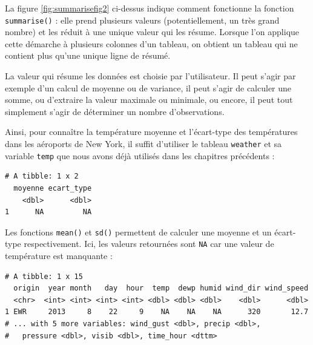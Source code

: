 \documentclass[
  a4paper,
]{article}
\newenvironment{Shaded}{\begin{snugshade}}{\end{snugshade}}
\newcommand{\DataTypeTok}[1]{\textcolor[rgb]{0.00,0.34,0.68}{#1}}
\newcommand{\KeywordTok}[1]{\textcolor[rgb]{0.12,0.11,0.11}{\textbf{#1}}}
\newcommand{\NormalTok}[1]{\textcolor[rgb]{0.12,0.11,0.11}{#1}}
\newcommand{\OperatorTok}[1]{\textcolor[rgb]{0.12,0.11,0.11}{#1}}
\newcommand{\StringTok}[1]{\textcolor[rgb]{0.75,0.01,0.01}{#1}}
\begin{document}
La figure \ref{fig:summarisefig2} ci-dessus indique comment fonctionne la fonction \texttt{summarise()} : elle prend plusieurs valeurs (potentiellement, un très grand nombre) et les réduit à une unique valeur qui les résume. Lorsque l'on applique cette démarche à plusieurs colonnes d'un tableau, on obtient un tableau qui ne contient plus qu'une unique ligne de résumé.

La valeur qui résume les données est choisie par l'utilisateur. Il peut s'agir par exemple d'un calcul de moyenne ou de variance, il peut s'agir de calculer une somme, ou d'extraire la valeur maximale ou minimale, ou encore, il peut tout simplement s'agir de déterminer un nombre d'observations.

Ainsi, pour connaître la température moyenne et l'écart-type des températures dans les aéroports de New York, il suffit d'utiliser le tableau \texttt{weather} et sa variable \texttt{temp} que nous avons déjà utilisés dans les chapitres précédents :

\begin{Shaded}
\end{Shaded}

\begin{verbatim}
# A tibble: 1 x 2
  moyenne ecart_type
    <dbl>      <dbl>
1      NA         NA
\end{verbatim}

Les fonctions \texttt{mean()} et \texttt{sd()} permettent de calculer une moyenne et un écart-type respectivement. Ici, les valeurs retournées sont \texttt{NA} car une valeur de température est manquante :

\begin{Shaded}
\end{Shaded}

\begin{verbatim}
# A tibble: 1 x 15
  origin  year month   day  hour  temp  dewp humid wind_dir wind_speed
  <chr>  <int> <int> <int> <int> <dbl> <dbl> <dbl>    <dbl>      <dbl>
1 EWR     2013     8    22     9    NA    NA    NA      320       12.7
# ... with 5 more variables: wind_gust <dbl>, precip <dbl>,
#   pressure <dbl>, visib <dbl>, time_hour <dttm>
\end{verbatim}
\end{document}
